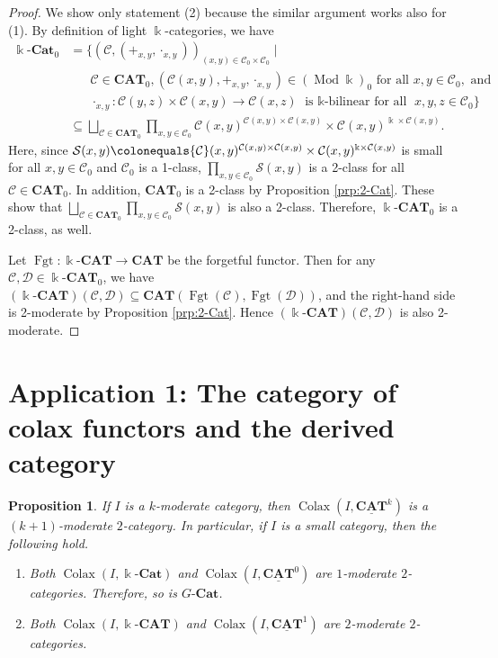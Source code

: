 \documentclass{surv-l}
\numberwithin{equation}{chapter}
\numberwithin{figure}{chapter}
\theoremstyle{plain}
\newtheorem{prp}[thm]{Proposition}
\theoremstyle{definition}
\theoremstyle{remark}
\newcommand{\kCAT}{\Bbbk\text{-}\mathbf{CAT}}
\newcommand{\kCat}{\Bbbk\text{-}\mathbf{Cat}}
\newcommand{\GCat}{G\text{-}\mathbf{Cat}}
\DeclareMathOperator{\Mod}{Mod}
\DeclareMathOperator{\Colax}{Colax}
\DeclareMathOperator{\Fgt}{Fgt}
\begin{document}
\begin{proof}
We show only statement (2) because the similar argument works also for (1).
By definition of light $\Bbbk$-categories, we have
\[
\begin{aligned}
\kCat_0&= \{({\mathcal{C}}, (+_{x,y}, \cdot_{x,y}))_{(x,y)\in {\mathcal{C}}_0 \times {\mathcal{C}}_0} \mid\\
&\hspace{20pt} {\mathcal{C}} \in \mathbf{CAT}_0, ({\mathcal{C}}(x,y), +_{x,y}, \cdot_{x,y}) \in (\Mod \Bbbk)_0
\text{ for all }x, y \in {\mathcal{C}}_0, \text{ and}\\
&\hspace{20pt}\cdot_{x,y} \colon {\mathcal{C}}(y, z) \times {\mathcal{C}}(x,y) \to {\mathcal{C}}(x,z) \text{ is $\Bbbk$-bilinear for all }
x, y,z \in {\mathcal{C}}_0\}\\
&\subseteq \bigsqcup_{{\mathcal{C}} \in \mathbf{CAT}_0} \prod_{x,y\in {\mathcal{C}}_0}{\mathcal{C}}(x,y)^{{\mathcal{C}}(x,y)\times {\mathcal{C}}(x,y)} \times
{\mathcal{C}}(x,y)^{\Bbbk \times {\mathcal{C}}(x,y)}.
\end{aligned}
\]
Here, since $\mathcal{S}(x,y)\colonequals  {\mathcal{C}}(x,y)^{{\mathcal{C}}(x,y)\times {\mathcal{C}}(x,y)} \times {\mathcal{C}}(x,y)^{\Bbbk \times {\mathcal{C}}(x,y)}$ is small for all
$x, y \in {\mathcal{C}}_0$ and ${\mathcal{C}}_0$ is a 1-class, $\prod_{x,y\in {\mathcal{C}}_0}\mathcal{S}(x,y)$ is a 2-class for all ${\mathcal{C}} \in \mathbf{CAT}_0$.
In addition, $\mathbf{CAT}_0$ is a 2-class by Proposition \ref{prp:2-Cat}.
These show that
$\bigsqcup_{{\mathcal{C}} \in \mathbf{CAT}_0}\prod_{x,y\in {\mathcal{C}}_0}\!\mathcal{S}(x,y)$ is also a 2-class.
Therefore, $\kCAT_0$ is a 2-class, as well.

Let $\Fgt \colon \kCAT \to \mathbf{CAT}$ be the forgetful functor.
Then for any ${\mathcal{C}}, {\mathcal{D}} \in \kCAT_0$, we have
$(\kCAT)({\mathcal{C}}, {\mathcal{D}}) \subseteq \mathbf{CAT}(\Fgt({\mathcal{C}}), \Fgt({\mathcal{D}}))$, and the right-hand side
is 2-moderate by Proposition \ref{prp:2-Cat}.
Hence $(\kCAT)({\mathcal{C}}, {\mathcal{D}})$ is also 2-moderate.
\pagebreak \end{proof}

\section[The category of colax functors and the derived
  category]{Application 1: The category of colax functors and the derived
  category}\label{app:a.5}
\begin{prp}
If $I$ is a $k$-moderate category, then $\Colax(I, \underline{\mathbf{CAT}}^k)$ is a $(k+1)$-moderate
$2$-category.
In particular, if $I$ is a small category, then the following hold.
\begin{enumerate}
\item
Both $\Colax(I, \kCat)$ and $\Colax(I, \underline{\mathbf{CAT}}^0)$ are $1$-moderate
$2$-categories.
Therefore, so is $\GCat$.
\item
Both $\Colax(I, \kCAT)$ and $\Colax(I, \underline{\mathbf{CAT}}^1)$ are $2$-moderate
$2$-categories.
\end{enumerate}
\end{prp}
\end{document}
